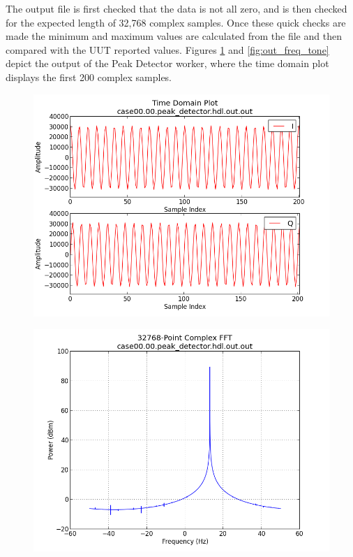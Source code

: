 \documentclass{article}
\def\Comp{Peak Detector}
\begin{document}
\begin{flushleft}
\begin{flushleft}
The output file is first checked that the data is not all zero, and is then checked for the expected length of 32,768 complex samples. Once these quick checks are made the minimum and maximum values are calculated from the file and then compared with the UUT reported values. Figures \ref{fig:out_time_tone} and \ref{fig:out_freq_tone} depict the output of the {\Comp} worker, where the time domain plot displays the first 200 complex samples.
\end{flushleft}
\newpage

        \begin{figure}[ht]
        \centering
                \begin{minipage}{.5\textwidth}
                        \centering\includegraphics[width=1.0\linewidth]{output_time}
                        \label{fig:out_time_tone}
                \end{minipage}%
                \begin{minipage}{.5\textwidth}
                        \centering\includegraphics[width=1.0\linewidth]{output_freq}

\end{minipage}
\end{figure}
\end{flushleft}
\end{document}
